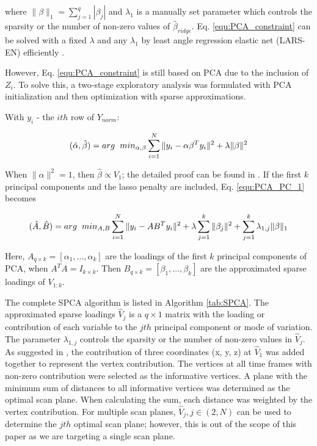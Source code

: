 \documentclass[review]{elsarticle}
\begin{document}
where $\|\beta\|_1=\sum_{j=1}^q|\beta_j|$ and $\lambda_1$ is a manually set parameter which controls the sparsity or the number of non-zero values of $\hat{\beta}_{ridge}$. Eq. \ref{equ:PCA_constraint} can be solved with a fixed $\lambda$ and any $\lambda_1$ by least angle regression elastic net (LARS-EN) efficiently \citep{zou2005regularization}.

However, Eq. \ref{equ:PCA_constraint} is still based on PCA due to the inclusion of $Z_i$. To solve this, a two-stage exploratory analysis was formulated with PCA initialization and then optimization with sparse approximations.

With $y_i$ - the $ith$ row of $Y_{norm}$:

\begin{equation}
(\hat{\alpha},\hat{\beta})=arg\hspace{0.2cm} min_{\alpha,\beta}\sum_{i=1}^N\|y_i-\alpha\beta^Ty_i\|^2+\lambda\|\beta\|^2
\label{equ:PCA_PC_1}
\end{equation}

When $\|\alpha\|^2=1$, then $\hat{\beta}\propto V_1$; the detailed proof can be found in \citep{zou2006sparse}. If the first $k$ principal components and the lasso penalty are included, Eq. \ref{equ:PCA_PC_1} becomes

\begin{equation}
(\hat{A},\hat{B})=arg\hspace{0.2cm} min_{A,B}\sum_{i=1}^N\|y_i-AB^Ty_i\|^2+\lambda\sum_{j=1}^k\|\beta_j\|^2+\sum_{j=1}^k \lambda_{1,j}\|\beta\|_1
\end{equation}
\label{equ:PCA_PC_k}

Here, $A_{q\times k}=[\alpha_1,...,\alpha_k]$ are the loadings of the first $k$ principal components of PCA, when $A^TA=I_{k\times k}$. Then $B_{q\times k}=[\beta_1,...,\beta_k]$ are the approximated sparse loadings of $V_{1:k}$. 

The complete SPCA algorithm is listed in Algorithm \ref{tab:SPCA}. The approximated sparse loadings $\hat{V}_j$ is a $q\times 1$ matrix with the loading or contribution of each variable to the $jth$ principal component or mode of variation. The parameter $\lambda_{1,j}$ controls the sparsity or the number of non-zero values in $\hat{V}_j$. As suggested in \citep{lee2005assessment}, the contribution of three coordinates (x, y, z) at $\hat{V}_1$ was added together to represent the vertex contribution. The vertices at all time frames with non-zero contribution were selected as the informative vertices. A plane with the minimum sum of distances to all informative vertices was determined as the optimal scan plane. When calculating the sum, each distance was weighted by the vertex contribution. For multiple scan planes, $\hat{V}_j, j\in(2,N)$ can be used to determine the $jth$ optimal scan plane; however, this is out of the scope of this paper as we are targeting a single scan plane.
\end{document}
